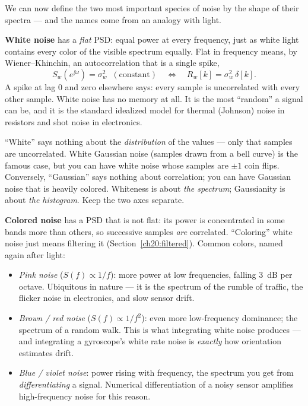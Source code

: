 We can now define the two most important species of noise by the shape of their
spectra --- and the names come from an analogy with light.

\textbf{White noise} has a \emph{flat} PSD: equal power at every frequency, just
as white light contains every color of the visible spectrum equally. Flat in
frequency means, by Wiener--Khinchin, an autocorrelation that is a single spike,
\[
  S_w(e^{\jj\omega}) = \sigma_w^2 \;\;(\text{constant})
  \quad\Longleftrightarrow\quad
  R_w[k] = \sigma_w^2\,\delta[k].
\]
A spike at lag $0$ and zero elsewhere says: every sample is uncorrelated with
every other sample. White noise has no memory at all. It is the most ``random''
a signal can be, and it is the standard idealized model for thermal (Johnson)
noise in resistors and shot noise in electronics.

\begin{trapbox}
``White'' says nothing about the \emph{distribution} of the values --- only that
samples are uncorrelated. White Gaussian noise (samples drawn from a bell curve)
is the famous case, but you can have white noise whose samples are $\pm 1$ coin
flips. Conversely, ``Gaussian'' says nothing about correlation; you can have
Gaussian noise that is heavily colored. Whiteness is about \emph{the spectrum};
Gaussianity is about \emph{the histogram}. Keep the two axes separate.
\end{trapbox}

\textbf{Colored noise} has a PSD that is not flat: its power is concentrated in
some bands more than others, so successive samples \emph{are} correlated.
``Coloring'' white noise just means filtering it (Section~\ref{ch20:filtered}).
Common colors, named again after light:
\begin{itemize}
  \item \emph{Pink noise} ($S(f)\propto 1/f$): more power at low frequencies,
        falling $3$~dB per octave. Ubiquitous in nature --- it is the spectrum of
        the rumble of traffic, the flicker noise in electronics, and slow sensor
        drift.
  \item \emph{Brown / red noise} ($S(f)\propto 1/f^2$): even more low-frequency
        dominance; the spectrum of a random walk. This is what integrating white
        noise produces --- and integrating a gyroscope's white rate noise is
        \emph{exactly} how orientation estimates drift.
  \item \emph{Blue / violet noise}: power rising with frequency, the spectrum you
        get from \emph{differentiating} a signal. Numerical differentiation of a
        noisy sensor amplifies high-frequency noise for this reason.
\end{itemize}


